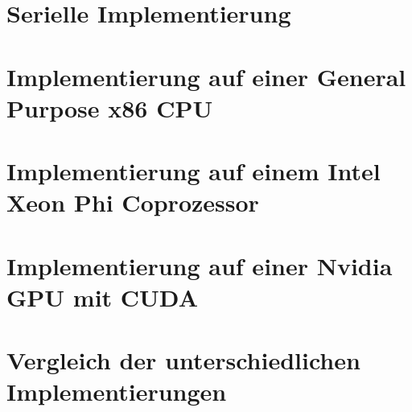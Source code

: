 \documentclass[12pt,oneside, 
liststotoc, 						%
bibtotoc,						%
titlepage, 						%
abstracton,					%
DIV11,						%
]{scrreprt}
\begin{document}
\chapter{Serielle Implementierung}

\clearpage

\chapter{Implementierung auf einer General Purpose x86 CPU}

\clearpage

\chapter{Implementierung auf einem Intel Xeon Phi Coprozessor}

\clearpage

\chapter{Implementierung auf einer Nvidia GPU mit CUDA}

\clearpage

\chapter{Vergleich der unterschiedlichen Implementierungen}

\clearpage

\printbibliography
\clearpage
\end{document}
